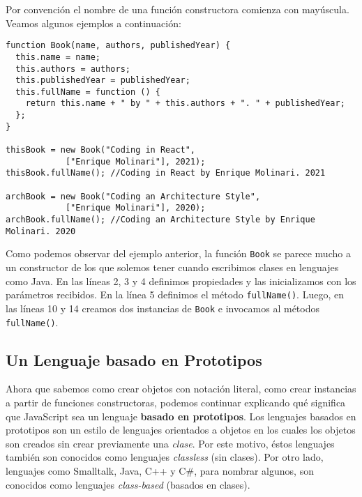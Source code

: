 \documentclass[a4paper, oneside, titlepage, 12pt]{paper}
\begin{document}
Por convención el nombre de una función constructora comienza con mayúscula. Veamos algunos ejemplos a continuación:

\begin{verbatim}
function Book(name, authors, publishedYear) {
  this.name = name;
  this.authors = authors;
  this.publishedYear = publishedYear;
  this.fullName = function () {
    return this.name + " by " + this.authors + ". " + publishedYear;
  };
}

thisBook = new Book("Coding in React", 
			["Enrique Molinari"], 2021);
thisBook.fullName(); //Coding in React by Enrique Molinari. 2021

archBook = new Book("Coding an Architecture Style", 
			["Enrique Molinari"], 2020);
archBook.fullName(); //Coding an Architecture Style by Enrique Molinari. 2020 
\end{verbatim}

Como podemos observar del ejemplo anterior, la función \texttt{Book} se parece mucho a un constructor de los que solemos tener cuando escribimos clases en lenguajes como Java. En las líneas 2, 3 y 4 definimos propiedades y las inicializamos con los parámetros recibidos. En la línea 5 definimos el método \texttt{fullName()}. Luego, en las líneas 10 y 14 creamos dos instancias de \texttt{Book} e invocamos al métodos \texttt{fullName()}. 


\subsection{Un Lenguaje basado en Prototipos}

Ahora que sabemos como crear objetos con notación literal, como crear instancias a partir de funciones constructoras, podemos continuar explicando qué significa que JavaScript sea un lenguaje \textbf{basado en prototipos}. Los lenguajes basados en prototipos son un estilo de lenguajes orientados a objetos en los cuales los objetos son creados sin crear previamente una \textit{clase}. Por este motivo, éstos lenguajes también son conocidos como lenguajes \textit{classless} (sin clases). Por otro lado, lenguajes como Smalltalk, Java, C++ y C\#, para nombrar algunos, son conocidos como lenguajes \textit{class-based} (basados en clases).
\newline
\end{document}
